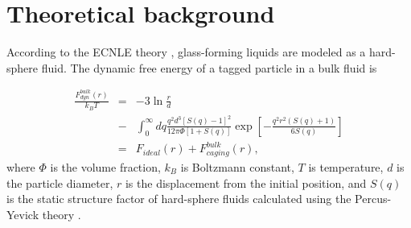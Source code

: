 \documentclass[twocolumn,preprintnumbers,amsmath,amssymb,superscriptaddress]{revtex4}
\begin{document}
\section{Theoretical background}
According to the ECNLE theory \cite{2,7,10,6,35,42,11,61,62,44,45}, glass-forming liquids are modeled as a hard-sphere fluid. The dynamic free energy of a tagged particle in a bulk fluid is

\begin{eqnarray}
\frac{F_{dyn}^{bulk}(r)}{k_BT} &=&-3\ln\frac{r}{d}
\nonumber\\ &-&\int_{0}^{\infty} dq\frac{ q^2d^3 \left[S(q)-1\right]^2}{12\pi\Phi\left[1+S(q)\right]}\exp\left[-\frac{q^2r^2(S(q)+1)}{6S(q)}\right]\nonumber\\
&=& F_{ideal}(r) + F_{caging}^{bulk}(r),
\label{eq:1}
\end{eqnarray}
where $\Phi$ is the volume fraction, $k_B$ is Boltzmann constant, $T$ is temperature, $d$ is the particle diameter, $r$ is the displacement from the initial position, and $S(q)$ is the static structure factor of hard-sphere fluids calculated using the Percus-Yevick theory \cite{1}.
\end{document}
